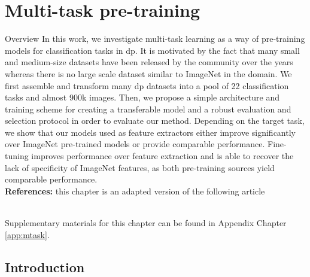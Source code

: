 \chapter{Multi-task pre-training}
\label{chap:mtask}


\begin{overview}{Overview}
In this work, we investigate multi-task learning as a way of pre-training models for classification tasks in \acrlong{dp}. It is motivated by the fact that many small and medium-size datasets have been released by the community over the years whereas there is no large scale dataset similar to ImageNet in the domain. We first assemble and transform many \acrlong{dp} datasets into a pool of 22 classification tasks and almost 900k images. Then, we propose a simple architecture and training scheme for creating a transferable model and a robust evaluation and selection protocol in order to evaluate our method. Depending on the target task, we show that our models used as feature extractors either improve significantly over ImageNet pre-trained models or provide comparable performance. Fine-tuning improves performance over feature extraction and is able to recover the lack of specificity of ImageNet features, as both pre-training sources yield comparable performance. \\

\textbf{References:} this chapter is an adapted version of the following article

 \\

Supplementary materials for this chapter can be found in Appendix Chapter \ref{app:mtask}.
\end{overview}



%


\section{Introduction}

